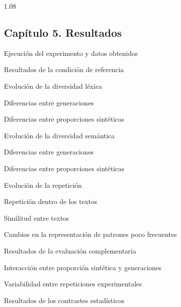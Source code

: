 \documentclass[12pt,letterpaper]{article}
\newcommand{\numerocap}{1}
\newcommand{\capitulo}[2]{\renewcommand{\numerocap}{#1}\Needspace{5\baselineskip}\subsection*{Capítulo #1. #2}}
\begin{document}
\begin{spacing}{1.08}
\capitulo{5}{Resultados}
\begin{apartados}
\item Ejecución del experimento y datos obtenidos
\item Resultados de la condición de referencia
\item Evolución de la diversidad léxica
\begin{apartados}
\item Diferencias entre generaciones
\item Diferencias entre proporciones sintéticas
\end{apartados}
\item Evolución de la diversidad semántica
\begin{apartados}
\item Diferencias entre generaciones
\item Diferencias entre proporciones sintéticas
\end{apartados}
\item Evolución de la repetición
\begin{apartados}
\item Repetición dentro de los textos
\item Similitud entre textos
\end{apartados}
\item Cambios en la representación de patrones poco frecuentes
\item Resultados de la evaluación complementaria
\item Interacción entre proporción sintética y generaciones
\item Variabilidad entre repeticiones experimentales
\item Resultados de los contrastes estadísticos
\end{apartados}


\end{spacing}
\end{document}
